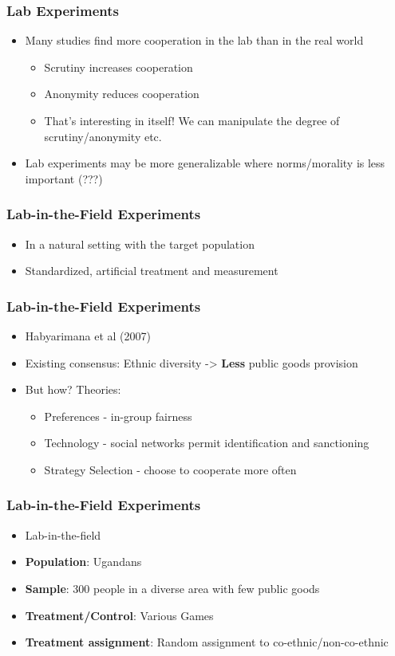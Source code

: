 \documentclass[xcolor=x11names,compress]{beamer}\usepackage[]{graphicx}\usepackage[]{color}
\renewcommand{\(}{\begin{columns}}
\renewcommand{\)}{\end{columns}}
\newcommand{\<}[1]{\begin{column}{#1}}
\renewcommand{\>}{\end{column}}
\begin{document}
\begin{frame}
\frametitle{Lab Experiments}
\begin{itemize}
\item Many studies find more cooperation in the lab than in the real world
\pause
\begin{itemize}
\item Scrutiny increases cooperation
\pause
\item Anonymity reduces cooperation
\pause
\item That's interesting in itself! We can manipulate the degree of scrutiny/anonymity etc.
\end{itemize}
\pause
\item Lab experiments may be more generalizable where norms/morality is less important (???)
\end{itemize}
\end{frame}

\begin{frame}
\frametitle{Lab-in-the-Field Experiments}
\begin{itemize}
\item In a natural setting with the target population
\pause
\item Standardized, artificial treatment and measurement
\end{itemize}
\end{frame}

\begin{frame}
\frametitle{Lab-in-the-Field Experiments}
\begin{itemize}
\item Habyarimana et al (2007)
\pause
\item Existing consensus: Ethnic diversity -> \textbf{Less} public goods provision
\pause
\item But how? Theories:
\pause
\begin{itemize}
\item Preferences - in-group fairness
\item Technology - social networks permit identification and sanctioning
\item Strategy Selection - choose to cooperate more often
\end{itemize}
\end{itemize}
\end{frame}

\begin{frame}
\frametitle{Lab-in-the-Field Experiments}
\begin{itemize}
\item Lab-in-the-field
\item \textbf{Population}: Ugandans
\item \textbf{Sample}: 300 people in a diverse area with few public goods
\item \textbf{Treatment/Control}: Various Games
\item \textbf{Treatment assignment}: Random assignment to co-ethnic/non-co-ethnic
\end{itemize}
\end{frame}
\end{document}
